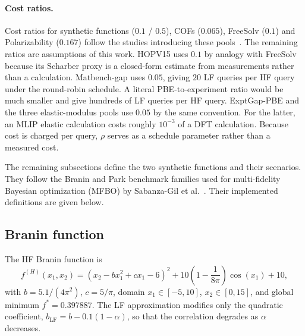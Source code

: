 \paragraph{Cost ratios.}
Cost ratios for synthetic functions ($0.1$ / $0.5$), COFs ($0.065$), FreeSolv ($0.1$) and Polarizability ($0.167$) follow the studies introducing these pools~\citep{sabanza2025best,gantzler2023multifidelity,fare2022multi}. The remaining ratios are assumptions of this work. HOPV15 uses $0.1$ by analogy with FreeSolv because its Scharber proxy is a closed-form estimate from measurements rather than a calculation. Matbench-gap uses $0.05$, giving $20$ LF queries per HF query under the round-robin schedule. A literal PBE-to-experiment ratio would be much smaller and give hundreds of LF queries per HF query. ExptGap-PBE and the three elastic-modulus pools use $0.05$ by the same convention. For the latter, an MLIP elastic calculation costs roughly $10^{-3}$ of a DFT calculation. Because cost is charged per query, $\rho$ serves as a schedule parameter rather than a measured cost.

The remaining subsections define the two synthetic functions and their scenarios. They follow the Branin and Park benchmark families used for multi-fidelity Bayesian optimization (MFBO) by Sabanza-Gil et al.~\citep{sabanza2025best}. Their implemented definitions are given below.

\subsection{Branin function}
The HF Branin function is
\begin{equation}
f^{(H)}(x_1, x_2) = \left(x_2 - b x_1^2 + c x_1 - 6\right)^2 + 10\left(1 - \frac{1}{8\pi}\right)\cos(x_1) + 10,
\end{equation}
with $b = 5.1/(4\pi^2)$, $c = 5/\pi$, domain $x_1 \in [-5, 10]$, $x_2 \in [0, 15]$, and
global minimum $f^* = 0.397887$. The LF approximation modifies only the
quadratic coefficient, $b_{\text{LF}} = b - 0.1(1-\alpha)$, so that the correlation
degrades as $\alpha$ decreases.

